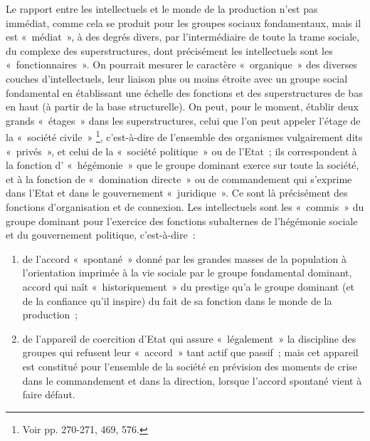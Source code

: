 \documentclass[french,twoside]{book} %
\begin{document}
Le rapport entre les intellectuels et le monde de la production n’est pas immédiat, comme cela se produit pour les groupes sociaux fondamentaux, mais il est « médiat », à des degrés divers, par l’intermédiaire de toute la trame sociale, du complexe des superstructures, dont précisément les intellectuels sont les « fonctionnaires ». On pourrait mesurer le caractère « organique » des diverses couches d’intellectuels, leur liaison plus ou moins étroite avec un groupe social fondamental en établissant une échelle des fonctions et des superstructures de bas en haut (à partir de la base structurelle). On peut, pour le moment, établir deux grands « étages » dans les superstructures, celui que l’on peut appeler l’étage de la « société civile » \footnote{Voir pp. 270-271, 469, 576.}, c’est-à-dire de l’ensemble des organismes vulgairement dits « privés », et celui de la « société politique » ou de l’Etat ; ils correspondent à la fonction d’ « hégémonie » que le groupe dominant exerce sur toute la société, et à la fonction de « domination directe » ou de commandement qui s’exprime dans l’Etat et dans le gouvernement « juridique ». Ce sont là précisément des fonctions d’organisation et de connexion. Les intellectuels sont les « commis » du groupe dominant pour l’exercice des fonctions subalternes de l’hégémonie sociale et du gouvernement politique, c’est-à-dire :\par

\begin{enumerate}[itemsep=0pt,]
\item de l’accord « spontané » donné par les grandes masses de la population à l’orientation imprimée à la vie sociale par le groupe fondamental dominant, accord qui naît « historiquement » du prestige qu’a le groupe dominant (et de la confiance qu’il inspire) du fait de sa fonction dans le monde de la production ; 
\item de l’appareil de coercition d’Etat qui assure « légalement » la discipline des groupes qui refusent leur « accord » tant actif que passif ; mais cet appareil est constitué pour l’ensemble de la société en prévision des moments de crise dans le commandement et dans la direction, lorsque l’accord spontané vient à faire défaut.
\end{enumerate}
\end{document}
